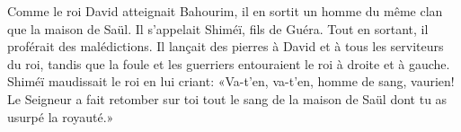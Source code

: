 Comme le roi David atteignait Bahourim,
	il en sortit un homme du même clan que la maison de Saül.
	Il s’appelait Shiméï, fils de Guéra.
Tout en sortant, il proférait des malédictions.
	Il lançait des pierres à David et à tous les serviteurs du roi,
	tandis que la foule et les guerriers entouraient le roi à droite et à gauche.
Shiméï maudissait le roi en lui criant:
	«Va-t’en, va-t’en, homme de sang, vaurien!
	Le Seigneur a fait retomber sur toi tout le sang de la maison de Saül
		dont tu as usurpé la royauté.»

